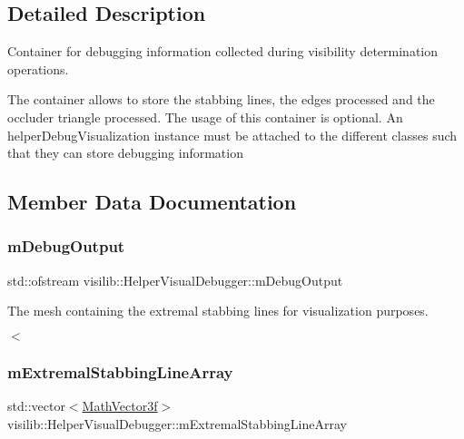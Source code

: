 \subsection{Detailed Description}
Container for debugging information collected during visibility determination operations. 

The container allows to store the stabbing lines, the edges processed and the occluder triangle processed. The usage of this container is optional. An helper\+Debug\+Visualization instance must be attached to the different classes such that they can store debugging information 

\subsection{Member Data Documentation}
\mbox{\label{classvisilib_1_1_helper_visual_debugger_a4c455f1401a41401c583e699128c833f}} 
\subsubsection{\texorpdfstring{mDebugOutput}{mDebugOutput}}
{\footnotesize\ttfamily std\+::ofstream visilib\+::\+Helper\+Visual\+Debugger\+::m\+Debug\+Output\hspace{0.3cm}{\ttfamily [private]}}



The mesh containing the extremal stabbing lines for visualization purposes. 

$<$ \mbox{\label{classvisilib_1_1_helper_visual_debugger_ab2d63d17fe8ef31d0798c2a42551a672}} 
\subsubsection{\texorpdfstring{mExtremalStabbingLineArray}{mExtremalStabbingLineArray}}
{\footnotesize\ttfamily std\+::vector$<$\mbox{\hyperlink{classvisilib_1_1_math_vector3__}{Math\+Vector3f}}$>$ visilib\+::\+Helper\+Visual\+Debugger\+::m\+Extremal\+Stabbing\+Line\+Array\hspace{0.3cm}{\ttfamily [private]}}



